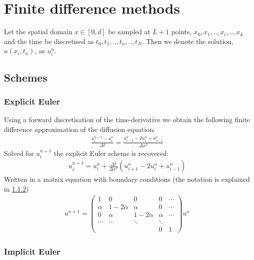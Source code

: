 \documentclass[11pt,a4paper,final]{article}
\numberwithin{equation}{section}
\begin{document}
\section{Finite difference methods}

Let the spatial domain $x \in [0,d]$ be sampled at $L+1$ points, $x_0,x_1,..,x_i,..,x_L$ and the time be discretised as $t_0,t_1,..,t_n,..,t_N$. Then we denote the solution, $u(x_i,t_n)$, as $u_i^n$.  

\subsection{Schemes}

\subsubsection{Explicit Euler}
Using a forward discretisation of the time-derivative we obtain the following finite difference approximation of the diffusion equation:
\begin{align}
\frac{u_{i}^{n+1}-u_{i}^{n}}{\Delta t} = \frac{u_{i-1}^{n}-2u_{i}^{n}+u_{i+1}^{n}}{\Delta x^2}
\end{align}
Solved for $u_{i}^{n+1}$ the explicit Euler scheme is recovered:
\begin{gather}
u_i^{n+1} = u_i^n + \frac{\Delta t}{\Delta x^2}\left(
u_{i+1}^n - 2u_i^n + u_{i-1}^n
\right)
\end{gather}
Written in a matrix equation with boundary conditions (the notation 
is explained in \ref{subsubsec:implicit_euler})
\begin{gather}
u^{n+1} = 
\begin{pmatrix}
1 & 0 & 0 & 0 & \cdots\\
\alpha & 1 - 2\alpha & \alpha & 0 & \cdots\\
0 & \alpha & 1-2\alpha & \alpha & \cdots\\
\cdots & \cdots & \ddots & \ddots& \\
&&& 0 & 1
\end{pmatrix} u^n
\end{gather}


\subsubsection{Implicit Euler}
\label{subsubsec:implicit_euler}
\end{document}
